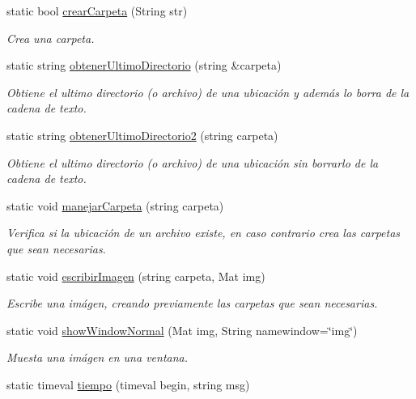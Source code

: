 \begin{DoxyCompactItemize}
static bool \mbox{\hyperlink{classCommonFunctions_acb8852ee747cb715a16e6dd9126d560d}{crear\+Carpeta}} (String str)
\begin{DoxyCompactList}\small\item\em Crea una carpeta. \end{DoxyCompactList}\item 
static string \mbox{\hyperlink{classCommonFunctions_a9b3747c4d4a2bc6d897ba1ae2ec59f00}{obtener\+Ultimo\+Directorio}} (string \&carpeta)
\begin{DoxyCompactList}\small\item\em Obtiene el ultimo directorio (o archivo) de una ubicación y además lo borra de la cadena de texto. \end{DoxyCompactList}\item 
static string \mbox{\hyperlink{classCommonFunctions_af27fbe7fc5de24747ddf5a0496016301}{obtener\+Ultimo\+Directorio2}} (string carpeta)
\begin{DoxyCompactList}\small\item\em Obtiene el ultimo directorio (o archivo) de una ubicación sin borrarlo de la cadena de texto. \end{DoxyCompactList}\item 
static void \mbox{\hyperlink{classCommonFunctions_a8f31532bc3dd60e5c95d40daaef7c705}{manejar\+Carpeta}} (string carpeta)
\begin{DoxyCompactList}\small\item\em Verifica si la ubicación de un archivo existe, en caso contrario crea las carpetas que sean necesarias. \end{DoxyCompactList}\item 
static void \mbox{\hyperlink{classCommonFunctions_a1cbb74aeab1ac5dc96ba4871d0f07792}{escribir\+Imagen}} (string carpeta, Mat img)
\begin{DoxyCompactList}\small\item\em Escribe una imágen, creando previamente las carpetas que sean necesarias. \end{DoxyCompactList}\item 
static void \mbox{\hyperlink{classCommonFunctions_a71529e35a71bbc74d49051d90a850c30}{show\+Window\+Normal}} (Mat img, String namewindow=\char`\"{}img\char`\"{})
\begin{DoxyCompactList}\small\item\em Muesta una imágen en una ventana. \end{DoxyCompactList}\item 
static timeval \mbox{\hyperlink{classCommonFunctions_a72ec70e251bf9b34409318b71e55d34e}{tiempo}} (timeval begin, string msg)

\end{DoxyCompactItemize}

